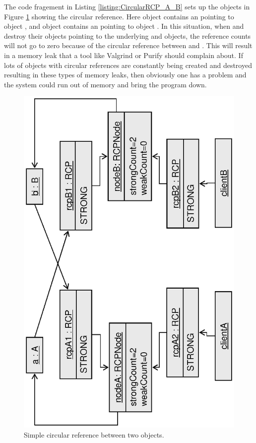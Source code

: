 \documentclass[pdf,ps2pdf,11pt]{SANDreport}
\begin{document}
The code fragement in Listing {}\ref{listing:CircularRCP_A_B} sets up
the objects in Figure {}\ref{fig:CircularRCP_A_B} showing the circular
reference.  Here object {} contains an {} pointing to
object {}, and object {} contains an {}
pointing to object {}.  In this situation, when {}
and {} destroy their {} objects pointing to the
underlying {} and {} objects, the reference counts will
not go to zero because of the circular reference between {} and
{}.  This will result in a memory leak that a tool like
Valgrind or Purify should complain about.  If lots of objects with
circular references are constantly being created and destroyed
resulting in these types of memory leaks, then obviously one has a
problem and the system could run out of memory and bring the program
down.

{\bsinglespace
\begin{figure}
\begin{center}
\includegraphics*[angle=270,scale=0.65]{CircularRCP_A_B}
\end{center}
\caption{
\label{fig:CircularRCP_A_B}
Simple circular reference between two objects.  }
\end{figure}
\esinglespace}
\end{document}
